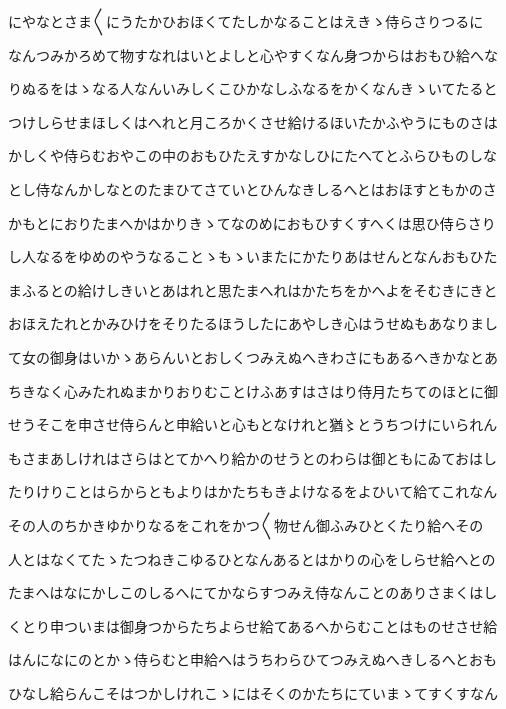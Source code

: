 \documentclass[a4paper,11pt,landscape]{ltjtarticle}
\begin{document}
にやなとさま〱にうたかひおほくてたしかなることはえきゝ侍らさりつるに
\par\medskip
なんつみかろめて物すなれはいとよしと心やすくなん身つからはおもひ給へな
\par\medskip
りぬるをはゝなる人なんいみしくこひかなしふなるをかくなんきゝいてたると
\par\medskip
つけしらせまほしくはへれと月ころかくさせ給けるほいたかふやうにものさは
\par\medskip
かしくや侍らむおやこの中のおもひたえすかなしひにたへてとふらひものしな
\par\medskip
とし侍なんかしなとのたまひてさていとひんなきしるへとはおほすともかのさ
\par\medskip
かもとにおりたまへかはかりきゝてなのめにおもひすくすへくは思ひ侍らさり
\par\medskip
し人なるをゆめのやうなることゝもゝいまたにかたりあはせんとなんおもひた
\par\medskip
まふるとの給けしきいとあはれと思たまへれはかたちをかへよをそむきにきと
\par\medskip
おほえたれとかみひけをそりたるほうしたにあやしき心はうせぬもあなりまし
\par\medskip
て女の御身はいかゝあらんいとおしくつみえぬへきわさにもあるへきかなとあ
\par\medskip
ちきなく心みたれぬまかりおりむことけふあすはさはり侍月たちてのほとに御
\par\medskip
せうそこを申させ侍らんと申給いと心もとなけれと猶〻とうちつけにいられん
\par\medskip
もさまあしけれはさらはとてかへり給かのせうとのわらは御ともにゐておはし
\par\medskip
たりけりことはらからともよりはかたちもきよけなるをよひいて給てこれなん
\par\medskip
その人のちかきゆかりなるをこれをかつ〱物せん御ふみひとくたり給へその
\par\medskip
人とはなくてたゝたつねきこゆるひとなんあるとはかりの心をしらせ給へとの
\par\medskip
たまへはなにかしこのしるへにてかならすつみえ侍なんことのありさまくはし
\par\medskip
くとり申ついまは御身つからたちよらせ給てあるへからむことはものせさせ給
\par\medskip
はんになにのとかゝ侍らむと申給へはうちわらひてつみえぬへきしるへとおも
\par\medskip
ひなし給らんこそはつかしけれこゝにはそくのかたちにていまゝてすくすなん
\par\medskip
\end{document}
